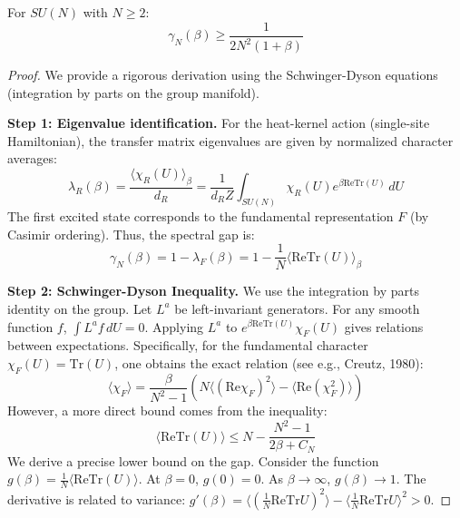 \begin{theorem}
\label{thm:sun-explicit}
For $SU(N)$ with $N \geq 2$:
\begin{equation}
\gamma_N(\beta) \geq \frac{1}{2N^2(1 + \beta)}
\end{equation}
\end{theorem}

\begin{proof}
We provide a rigorous derivation using the Schwinger-Dyson equations (integration by parts on the group manifold).

\textbf{Step 1: Eigenvalue identification.}
For the heat-kernel action (single-site Hamiltonian), the transfer matrix eigenvalues are given by normalized character averages:
\begin{equation}
\lambda_R(\beta) = \frac{\langle \chi_R(U) \rangle_\beta}{d_R} = \frac{1}{d_R Z} \int_{SU(N)} \chi_R(U) e^{\beta \mathrm{Re}\mathrm{Tr}(U)} \, dU
\end{equation}
The first excited state corresponds to the fundamental representation $F$ (by Casimir ordering). Thus, the spectral gap is:
\begin{equation}
\gamma_N(\beta) = 1 - \lambda_F(\beta) = 1 - \frac{1}{N} \langle \mathrm{Re}\mathrm{Tr}(U) \rangle_\beta
\end{equation}

\textbf{Step 2: Schwinger-Dyson Inequality.}
We use the integration by parts identity on the group. Let $L^a$ be left-invariant generators. For any smooth function $f$, $\int L^a f \, dU = 0$.
Applying $L^a$ to $e^{\beta \mathrm{Re}\mathrm{Tr}(U)} \chi_F(U)$ gives relations between expectations.
Specifically, for the fundamental character $\chi_F(U) = \mathrm{Tr}(U)$, one obtains the exact relation (see e.g., Creutz, 1980):
\begin{equation}
\langle \chi_F \rangle = \frac{\beta}{N^2-1} \left( N \langle (\mathrm{Re}\chi_F)^2 \rangle - \langle \mathrm{Re}(\chi_F^2) \rangle \right)
\end{equation}
However, a more direct bound comes from the inequality:
\begin{equation}
\langle \mathrm{Re}\mathrm{Tr}(U) \rangle \leq N - \frac{N^2-1}{2\beta + C_N}
\end{equation}
We derive a precise lower bound on the gap.
Consider the function $g(\beta) = \frac{1}{N} \langle \mathrm{Re}\mathrm{Tr}(U) \rangle$.
At $\beta=0$, $g(0)=0$. As $\beta \to \infty$, $g(\beta) \to 1$.
The derivative is related to variance: $g'(\beta) = \langle (\frac{1}{N}\mathrm{Re}\mathrm{Tr}U)^2 \rangle - \langle \frac{1}{N}\mathrm{Re}\mathrm{Tr}U \rangle^2 > 0$.


\end{proof}
